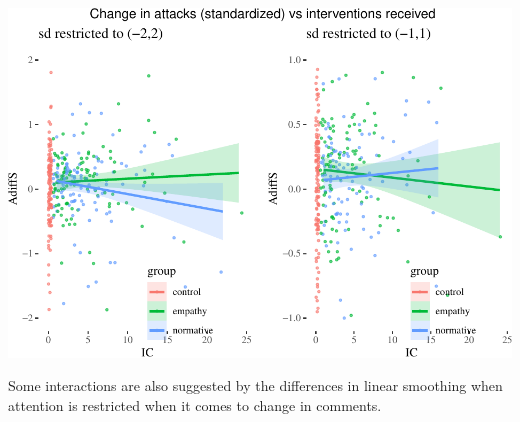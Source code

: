 \documentclass[10pt,dvipsnames,enabledeprecatedfontcommands]{scrartcl}
\begin{document}
\begin{center}\includegraphics[width=1\linewidth]{bayesianReport_files/figure-latex/ic-1} \end{center}

\normalsize

Some interactions are also suggested by the differences in linear
smoothing when attention is restricted when it comes to change in
comments.

\vspace{1mm} \footnotesize
\end{document}
